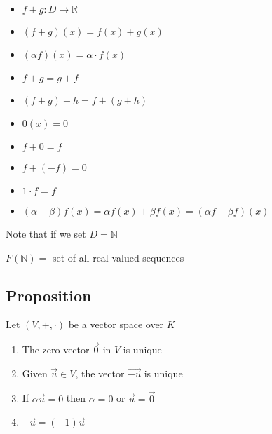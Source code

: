 \documentclass[12pt]{article}
\renewcommand{\v}[1]{\overrightarrow{#1}}
\newcommand{\real}[0]{\mathbb{R}}
\renewcommand{\natural}[0]{\mathbb{N}}
\begin{document}

\begin{itemize}
	\item $f + g : D \rightarrow \real$
	\item $(f + g)(x) = f(x) + g(x)$
	\item $(\alpha f)(x) = \alpha \cdot f(x)$
	\item $f + g = g + f$
	\item $(f + g) + h = f + (g + h)$
	\item $0(x) = 0$
	\item $f + 0 = f$
	\item $f + (-f) = 0$
	\item $1 \cdot f = f$
	\item $(\alpha + \beta) f(x) = \alpha f(x) + \beta f(x) = (\alpha f + \beta f)(x)$
\end{itemize}

Note that if we set $D = \natural$

$F(\natural) =$ set of all real-valued sequences

\subsection{Proposition}

Let $(V, +, \cdot)$ be a vector space over $K$


\begin{enumerate}
	\item The zero vector $\v{0}$ in $V$ is unique
	\item Given $\v{u} \in V$, the vector $\v{-u}$ is unique
	\item If $\alpha \v{u} = 0$ then $\alpha = 0$ or $\v{u} = \v{0}$
	\item $\v{-u} = (-1) \v{u}$
\end{enumerate}

\end{document}
